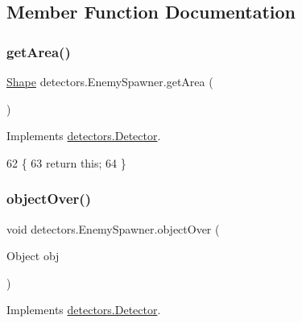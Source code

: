 \subsection{Member Function Documentation}
\mbox{\label{classdetectors_1_1_enemy_spawner_ab55d4ed3cd9441360ad9bae40436216e}} 
\subsubsection{\texorpdfstring{get\+Area()}{getArea()}}
{\footnotesize\ttfamily \mbox{\hyperlink{classorg_1_1newdawn_1_1slick_1_1geom_1_1_shape}{Shape}} detectors.\+Enemy\+Spawner.\+get\+Area (\begin{DoxyParamCaption}{ }\end{DoxyParamCaption})\hspace{0.3cm}{\ttfamily [inline]}}



Implements \mbox{\hyperlink{interfacedetectors_1_1_detector_a0b2ecb13c6db0ff6a02e57c193bcf8b2}{detectors.\+Detector}}.


\begin{DoxyCode}
62                            \{
63         \textcolor{keywordflow}{return} \textcolor{keyword}{this};
64     \}
\end{DoxyCode}
\mbox{\label{classdetectors_1_1_enemy_spawner_aa3dd6110b4138a184c02012cdb75242e}} 
\subsubsection{\texorpdfstring{object\+Over()}{objectOver()}}
{\footnotesize\ttfamily void detectors.\+Enemy\+Spawner.\+object\+Over (\begin{DoxyParamCaption}\item[{Object}]{obj }\end{DoxyParamCaption})\hspace{0.3cm}{\ttfamily [inline]}}



Implements \mbox{\hyperlink{interfacedetectors_1_1_detector_ab35eeb78e8216f8100d4651993668d44}{detectors.\+Detector}}.



